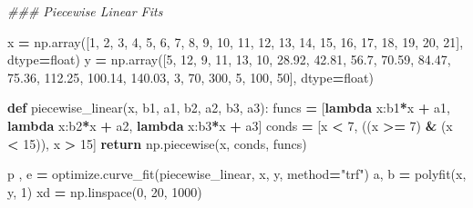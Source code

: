 \documentclass[
]{book}
\newenvironment{Shaded}{\begin{snugshade}}{\end{snugshade}}
\newcommand{\BuiltInTok}[1]{#1}
\newcommand{\CommentTok}[1]{\textcolor[rgb]{0.56,0.35,0.01}{\textit{#1}}}
\newcommand{\ControlFlowTok}[1]{\textcolor[rgb]{0.13,0.29,0.53}{\textbf{#1}}}
\newcommand{\DecValTok}[1]{\textcolor[rgb]{0.00,0.00,0.81}{#1}}
\newcommand{\FloatTok}[1]{\textcolor[rgb]{0.00,0.00,0.81}{#1}}
\newcommand{\KeywordTok}[1]{\textcolor[rgb]{0.13,0.29,0.53}{\textbf{#1}}}
\newcommand{\NormalTok}[1]{#1}
\newcommand{\OperatorTok}[1]{\textcolor[rgb]{0.81,0.36,0.00}{\textbf{#1}}}
\newcommand{\StringTok}[1]{\textcolor[rgb]{0.31,0.60,0.02}{#1}}
\theoremstyle{definition}
\theoremstyle{definition}
\theoremstyle{definition}
\theoremstyle{remark}
\begin{document}
\begin{Shaded}
\begin{Highlighting}[]
\CommentTok{\#\#\# Piecewise Linear Fits}

\NormalTok{x }\OperatorTok{=}\NormalTok{ np.array([}\DecValTok{1}\NormalTok{, }\DecValTok{2}\NormalTok{, }\DecValTok{3}\NormalTok{, }\DecValTok{4}\NormalTok{, }\DecValTok{5}\NormalTok{, }\DecValTok{6}\NormalTok{, }\DecValTok{7}\NormalTok{, }\DecValTok{8}\NormalTok{, }\DecValTok{9}\NormalTok{, }\DecValTok{10}\NormalTok{, }\DecValTok{11}\NormalTok{, }\DecValTok{12}\NormalTok{, }\DecValTok{13}\NormalTok{, }\DecValTok{14}\NormalTok{, }\DecValTok{15}\NormalTok{, }\DecValTok{16}\NormalTok{, }\DecValTok{17}\NormalTok{, }\DecValTok{18}\NormalTok{, }\DecValTok{19}\NormalTok{, }\DecValTok{20}\NormalTok{, }\DecValTok{21}\NormalTok{],  dtype}\OperatorTok{=}\BuiltInTok{float}\NormalTok{)}
\NormalTok{y }\OperatorTok{=}\NormalTok{ np.array([}\DecValTok{5}\NormalTok{, }\DecValTok{12}\NormalTok{, }\DecValTok{9}\NormalTok{, }\DecValTok{11}\NormalTok{, }\DecValTok{13}\NormalTok{, }\DecValTok{10}\NormalTok{,}
              \FloatTok{28.92}\NormalTok{, }\FloatTok{42.81}\NormalTok{, }\FloatTok{56.7}\NormalTok{, }\FloatTok{70.59}\NormalTok{, }\FloatTok{84.47}\NormalTok{, }\FloatTok{75.36}\NormalTok{, }\FloatTok{112.25}\NormalTok{, }\FloatTok{100.14}\NormalTok{, }\FloatTok{140.03}\NormalTok{, }\DecValTok{3}\NormalTok{, }\DecValTok{70}\NormalTok{, }\DecValTok{300}\NormalTok{, }\DecValTok{5}\NormalTok{, }\DecValTok{100}\NormalTok{, }\DecValTok{50}\NormalTok{], dtype}\OperatorTok{=}\BuiltInTok{float}\NormalTok{)}

\KeywordTok{def}\NormalTok{ piecewise\_linear(x, b1, a1,  b2, a2, b3, a3):}
\NormalTok{    funcs }\OperatorTok{=}\NormalTok{ [}\KeywordTok{lambda}\NormalTok{ x:b1}\OperatorTok{*}\NormalTok{x }\OperatorTok{+}\NormalTok{ a1,}
             \KeywordTok{lambda}\NormalTok{ x:b2}\OperatorTok{*}\NormalTok{x }\OperatorTok{+}\NormalTok{ a2,}
             \KeywordTok{lambda}\NormalTok{ x:b3}\OperatorTok{*}\NormalTok{x }\OperatorTok{+}\NormalTok{ a3]}
\NormalTok{    conds }\OperatorTok{=}\NormalTok{ [x }\OperatorTok{\textless{}} \DecValTok{7}\NormalTok{, ((x }\OperatorTok{\textgreater{}=} \DecValTok{7}\NormalTok{) }\OperatorTok{\&}\NormalTok{ (x }\OperatorTok{\textless{}} \DecValTok{15}\NormalTok{)), x }\OperatorTok{\textgreater{}} \DecValTok{15}\NormalTok{]}
    \ControlFlowTok{return}\NormalTok{ np.piecewise(x, conds, funcs)}

\NormalTok{p , e }\OperatorTok{=}\NormalTok{ optimize.curve\_fit(piecewise\_linear, x, y, method}\OperatorTok{=}\StringTok{"trf"}\NormalTok{)}
\NormalTok{a, b }\OperatorTok{=}\NormalTok{ polyfit(x, y, }\DecValTok{1}\NormalTok{)}
\NormalTok{xd }\OperatorTok{=}\NormalTok{ np.linspace(}\DecValTok{0}\NormalTok{, }\DecValTok{20}\NormalTok{, }\DecValTok{1000}\NormalTok{)}


\end{Highlighting}
\end{Shaded}
\end{document}
